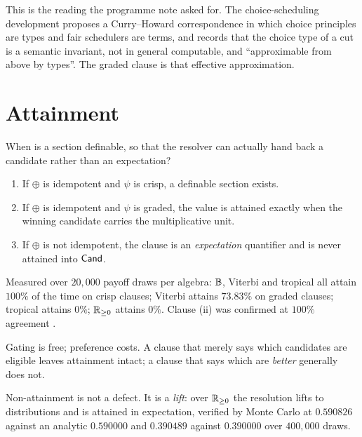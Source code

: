 This is the reading the programme note asked for. The choice-scheduling
development \cite{ChoiceScheduling} proposes a Curry--Howard correspondence in
which choice principles are types and fair schedulers are terms, and records that
the choice type of a cut is a semantic invariant, not in general computable, and
``approximable from above by types''. The graded clause is that effective
approximation.

\section{Attainment}
\label{sec:attainment}

When is a section definable, so that the resolver can actually hand back a
candidate rather than an expectation?

\begin{proposition}[Attainability]
\label{prop:attain}
\begin{enumerate}[label=(\roman*),leftmargin=2.2em]
\item If $\oplus$ is idempotent and $\psi$ is crisp, a definable section exists.
\item If $\oplus$ is idempotent and $\psi$ is graded, the value is attained
exactly when the winning candidate carries the multiplicative unit.
\item If $\oplus$ is not idempotent, the clause is an \emph{expectation}
quantifier and is never attained into $\mathsf{Cand}$.
\end{enumerate}
\end{proposition}

Measured over $20{,}000$ payoff draws per algebra: $\mathbb{B}$, Viterbi and tropical all
attain $100\%$ of the time on crisp clauses; Viterbi attains $73.83\%$ on graded
clauses; tropical attains $0\%$; $\mathbb{R}_{\ge0}$ attains $0\%$. Clause (ii) was
confirmed at $100\%$ agreement \cite{ChoiceFormulae}.

\begin{remark}
Gating is free; preference costs. A clause that merely says which candidates are
eligible leaves attainment intact; a clause that says which are \emph{better}
generally does not.
\end{remark}

Non-attainment is not a defect. It is a \emph{lift}: over $\mathbb{R}_{\ge0}$ the
resolution lifts to distributions and is attained in expectation, verified by
Monte Carlo at $0.590826$ against an analytic $0.590000$ and $0.390489$ against
$0.390000$ over $400{,}000$ draws.

